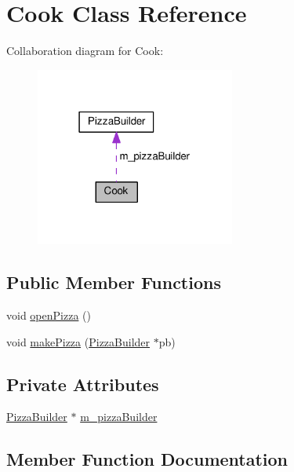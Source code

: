\hypertarget{classCook}{}\section{Cook Class Reference}
\label{classCook}


Collaboration diagram for Cook\+:\nopagebreak
\begin{figure}[H]
\begin{center}
\leavevmode
\includegraphics[width=186pt]{classCook__coll__graph}
\end{center}
\end{figure}
\subsection*{Public Member Functions}
\begin{DoxyCompactItemize}
\item 
void \hyperlink{classCook_a980a6342fae6617fc29fdb08101d2372}{open\+Pizza} ()
\item 
void \hyperlink{classCook_a14b38189b02518a8fc89c10529ea59d8}{make\+Pizza} (\hyperlink{classPizzaBuilder}{Pizza\+Builder} $\ast$pb)
\end{DoxyCompactItemize}
\subsection*{Private Attributes}
\begin{DoxyCompactItemize}
\item 
\hyperlink{classPizzaBuilder}{Pizza\+Builder} $\ast$ \hyperlink{classCook_a41e1afd843fef561893f8a4b54972132}{m\+\_\+pizza\+Builder}
\end{DoxyCompactItemize}


\subsection{Member Function Documentation}
